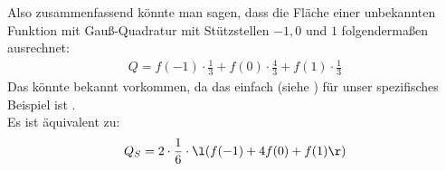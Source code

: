 {		Also zusammenfassend könnte man sagen, dass die Fläche einer unbekannten Funktion mit Gauß-Quadratur mit Stützstellen $-1, 0$ und $1$ folgendermaßen ausrechnet:
		\begin{align*}
			Q = f(-1) \cdot \frac{1}{3} + f(0) \cdot \frac{4}{3} + f(1) \cdot \frac{1}{3}
		\end{align*}
		Das könnte bekannt vorkommen, da das einfach  (siehe ) für unser spezifisches Beispiel ist \Winkey. \\
		Es ist äquivalent zu:
		\begin{align*}
			Q_S = 2 \cdot \frac{1}{6} \cdot \l(f(-1) + 4 f(0) + f(1) \r)
		\end{align*}
	}

	
